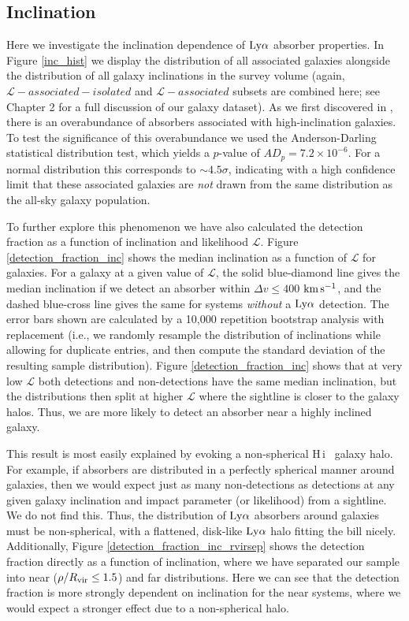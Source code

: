 \documentclass[twocolumn,tighten]{aastex62}
\newcommand{\kms}{$\rm km\, s^{-1}$}
\newcommand{\HI}{\mbox{H\,{\sc i}} }
\begin{document}
\subsection{Inclination}

Here we investigate the inclination dependence of $\rm Ly\alpha$ absorber properties. In Figure \ref{inc_hist} we display the distribution of all associated galaxies alongside the distribution of all galaxy inclinations in the survey volume (again, $\mathcal{L}-associated-isolated$ and $\mathcal{L}-associated$ subsets are combined here; see Chapter 2 for a full discussion of our galaxy dataset). As we first discovered in \cite{french2017}, there is an overabundance of absorbers associated with high-inclination galaxies. To test the significance of this overabundance we used the Anderson-Darling statistical distribution test, which yields a $p$-value of $AD_p = 7.2 \times 10^{-6}$. For a normal distribution this corresponds to $\sim 4.5 \sigma$, indicating with a high confidence limit that these associated galaxies are \emph{not} drawn from the same distribution as the all-sky galaxy population.


To further explore this phenomenon we have also calculated the detection fraction as a function of inclination and likelihood $\mathcal{L}$. Figure \ref{detection_fraction_inc} shows the median inclination as a function of $\mathcal{L}$ for galaxies. For a galaxy at a given value of $\mathcal{L}$, the solid blue-diamond line gives the median inclination if we detect an absorber within $\Delta v \leq 400$ \kms, and the dashed blue-cross line gives the same for systems \emph{without} a $\rm Ly\alpha$ detection. The error bars shown are calculated by a 10,000 repetition bootstrap analysis with replacement (i.e., we randomly resample the distribution of inclinations while allowing for duplicate entries, and then compute the standard deviation of the resulting sample distribution). Figure \ref{detection_fraction_inc} shows that at very low $\mathcal{L}$ both detections and non-detections have the same median inclination, but the distributions then split at higher $\mathcal{L}$ where the sightline is closer to the galaxy halos. Thus, we are more likely to detect an absorber near a highly inclined galaxy. 


This result is most easily explained by evoking a non-spherical \HI~galaxy halo. For example, if absorbers are distributed in a perfectly spherical manner around galaxies, then we would expect just as many non-detections as detections at any given galaxy inclination and impact parameter (or likelihood) from a sightline. We do not find this. Thus, the distribution of $\rm Ly\alpha$ absorbers around galaxies must be non-spherical, with a flattened, disk-like $\rm Ly\alpha$ halo fitting the bill nicely. Additionally, Figure \ref{detection_fraction_inc_rvirsep} shows the detection fraction directly as a function of inclination, where we have separated our sample into near ($\rho / R_{\rm vir} \leq 1.5$) and far distributions. Here we can see that the detection fraction is more strongly dependent on inclination for the near systems, where we would expect a stronger effect due to a non-spherical halo.
\end{document}
